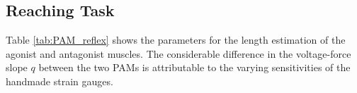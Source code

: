 \begin{table}[H]
    \centering
    \caption{Error Percentages of Dynamic Length Estimation under Different Model Equations}
    \label{tab:errors}
\end{table}


    
\subsection{Reaching Task}
Table \ref{tab:PAM_reflex} shows the parameters for the length estimation of the agonist and antagonist muscles. The considerable difference in the voltage-force slope $q$ between the two PAMs is attributable to the varying sensitivities of the handmade strain gauges.

